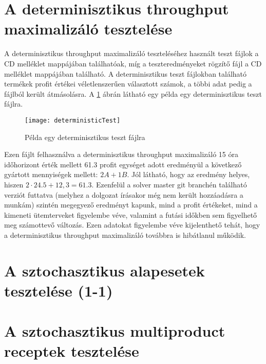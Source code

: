 \section{A determinisztikus throughput maximalizáló tesztelése}
A determinisztikus throughput maximalizáló teszteléséhez használt teszt fájlok a CD melléklet   mappájában találhatóak, míg a teszteredményeket rögzítő  fájl a CD melléklet  mappájában található.
A determinisztikus teszt fájlokban található termékek profit értékei véletlenszerűen választott számok, a többi adat pedig a  fájlból került átmásolásra.
A \ref{deterministic_test} ábrán látható egy példa egy determinisztikus teszt fájlra.
\begin{figure}[H]
\begin{center}
\texttt{[image: deterministicTest]}
\caption{Példa egy determinisztikus teszt fájlra}
\label{deterministic_test}
\end{center}
\end{figure}
Ezen fájlt felhasználva a determinisztikus throughput maximalizáló 15 óra időhorizont érték mellett 61.3 profit egységet adott eredményül a következő gyártott mennyiségek mellett: $2A+1B$.
Jól látható, hogy az eredmény helyes, hiszen $2 \cdot 24.5 +12,3=61.3$.
Ezenfelül a solver master git branchén található verziót futtatva (melyhez a dolgozat írásakor még nem került hozzáadásra a munkám) szintén megegyező eredményt kapunk, mind a profit értékeket, mind a kimeneti ütemterveket figyelembe véve, valamint a futási időkben sem figyelhető meg számottevő változás.
Ezen adatokat figyelembe véve kijelenthető tehát, hogy a determinisztikus throughput maximalizáló továbbra is hibátlanul működik.     
\section{A sztochasztikus alapesetek tesztelése (1-1)}
\section{A sztochasztikus multiproduct receptek tesztelése}